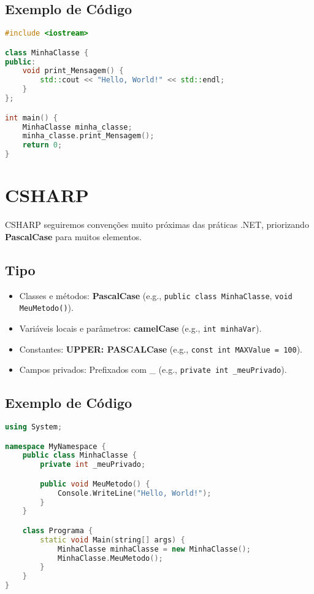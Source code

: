 \documentclass[12pt,a4paper]{article}
\begin{document}
\subsection*{Exemplo de Código}
\begin{lstlisting}[language=C++]
#include <iostream>

class MinhaClasse {
public:
    void print_Mensagem() {
        std::cout << "Hello, World!" << std::endl;
    }
};

int main() {
    MinhaClasse minha_classe;
    minha_classe.print_Mensagem();
    return 0;
}
\end{lstlisting}

\section{CSHARP}
CSHARP seguiremos convenções muito próximas das práticas .NET, priorizando \textbf{PascalCase} para muitos elementos.
\subsection*{Tipo}
\begin{itemize}
    \item Classes e métodos: \textbf{PascalCase} (e.g., \lstinline|public class MinhaClasse|, \lstinline|void MeuMetodo()|).
    \item Variáveis locais e parâmetros: \textbf{camelCase} (e.g., \lstinline|int minhaVar|).
    \item Constantes: \textbf{UPPER: PASCALCase} (e.g., \lstinline|const int MAXValue = 100|).
    \item Campos privados: Prefixados com \_ (e.g., \lstinline|private int _meuPrivado|).
\end{itemize}

\subsection*{Exemplo de Código}
\begin{lstlisting}[language=C++]
using System;

namespace MyNamespace {
    public class MinhaClasse {
        private int _meuPrivado;

        public void MeuMetodo() {
            Console.WriteLine("Hello, World!");
        }
    }

    class Programa {
        static void Main(string[] args) {
            MinhaClasse minhaClasse = new MinhaClasse();
            MinhaClasse.MeuMetodo();
        }
    }
}
\end{lstlisting}
\end{document}

